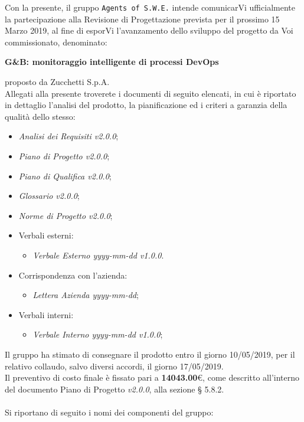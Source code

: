 \documentclass[11pt, a4paper]{letter} %
\begin{document}
\begin{letter}
		Con la presente, il gruppo \texttt{Agents of S.W.E.} intende comunicarVi ufficialmente la partecipazione alla Revisione di Progettazione prevista per il prossimo 15 Marzo 2019, al fine di esporVi l'avanzamento dello sviluppo del progetto da Voi commissionato, denominato:
		\begin{center}
			\textbf{G\&B: monitoraggio intelligente di processi DevOps}
		\end{center}
		proposto da Zucchetti S.p.A.\\
		Allegati alla presente troverete i documenti di seguito elencati, in cui è riportato in dettaglio l'analisi del prodotto, la pianificazione ed i criteri a garanzia della qualità dello stesso:
		\begin{itemize}
			\item \textit{Analisi dei Requisiti v2.0.0};
			\item  \textit{Piano di Progetto v2.0.0};
			\item \textit{Piano di Qualifica v2.0.0};
			\item \textit{Glossario v2.0.0};
			\item \textit{Norme di Progetto v2.0.0};	
			\item Verbali esterni: 
			\begin{itemize}
				\item \textit{Verbale Esterno yyyy-mm-dd v1.0.0}.
			\end{itemize}
			\item Corrispondenza con l'azienda: 
			\begin{itemize}
				\item \textit{Lettera Azienda yyyy-mm-dd};
			\end{itemize}
			\item Verbali interni: 
			\begin{itemize}
				\item \textit{Verbale Interno yyyy-mm-dd v1.0.0};
			\end{itemize}
		\end{itemize}
		Il gruppo ha stimato di consegnare il prodotto entro il giorno 10/05/2019, per il relativo collaudo, salvo diversi accordi, il giorno 17/05/2019.\\  
		Il preventivo di costo finale è fissato pari a \textbf{14043.00}€, come descritto all'interno del documento Piano di Progetto \textit{v2.0.0}, alla sezione § 5.8.2.\\ %
		\-\\
		Si riportano di seguito i nomi dei componenti del gruppo:

\end{letter}
\end{document}
